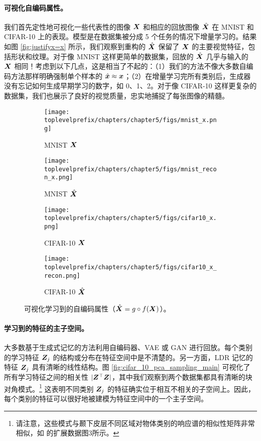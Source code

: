 \documentclass[../../book-main_zh.tex]{subfiles}
\begin{document}
\paragraph{可视化自编码属性。}
我们首先定性地可视化一些代表性的图像 $\bm{X}$ 和相应的回放图像 $\hat{\bm{X}}$ 在 MNIST 和 CIFAR-10 上的表现。模型是在数据集被分成 5 个任务的情况下增量学习的。结果如图 \ref{fig:justifyx=x} 所示，我们观察到重构的 $\hat{\bm{X}}$ 保留了 $\bm{X}$ 的主要视觉特征，包括形状和纹理。对于像 MNIST 这样更简单的数据集，回放的 $\hat{\bm{X}}$ 几乎与输入的 $\bm{X}$ 相同！考虑到以下几点，这是相当了不起的：（1）我们的方法不像大多数自编码方法那样明确强制单个样本的 $\hat{\bm{x}} \approx \bm{x}$；（2）在增量学习完所有类别后，生成器没有忘记如何生成早期学习的数字，如 0、1、2。对于像 CIFAR-10 这样更复杂的数据集，我们也展示了良好的视觉质量，忠实地捕捉了每张图像的精髓。

\begin{figure}[t]
    \begin{subfigure}[t]{0.20\textwidth}
        \centering
        \texttt{[image: \\toplevelprefix/chapters/chapter5/figs/mnist\_x.png]}
        \caption{MNIST $\bm{X}$}
    \end{subfigure}
    \hfill
    \begin{subfigure}[t]{0.20\textwidth}
        \centering
        \texttt{[image: \\toplevelprefix/chapters/chapter5/figs/mnist\_recon\_x.png]}
        \caption{MNIST $\hat{\bm{X}}$}
    \end{subfigure}
    \hfill
    \begin{subfigure}[t]{0.20\textwidth}
        \centering
        \texttt{[image: \\toplevelprefix/chapters/chapter5/figs/cifar10\_x.png]}
        \caption{CIFAR-10 $\bm{X}$}
    \end{subfigure}
    \hfill
    \begin{subfigure}[t]{0.20\textwidth}
        \centering
        \texttt{[image: \\toplevelprefix/chapters/chapter5/figs/cifar10\_x\_recon.png]}
        \caption{CIFAR-10 $\hat{\bm{X}}$}
    \end{subfigure}
    \caption{\small 可视化学习到的自编码属性（$\hat{\bm{X}} = g\circ f(\bm{X})$）。}
\end{figure}


\paragraph{学习到的特征的主子空间。}
大多数基于生成式记忆的方法利用自编码器、VAE 或 GAN 进行回放。每个类别的学习特征 $\bm{Z}_j$ 的结构或分布在特征空间中是不清楚的。另一方面，LDR 记忆的特征 $\bm{Z}_j$ 具有清晰的线性结构。图 \ref{fig:cifar_10_pca_sampling_main} 可视化了所有学习特征之间的相关性 $|\bm{Z}^\top\bm{Z}|$，其中我们观察到两个数据集都具有清晰的块对角模式。\footnote{请注意，这些模式与颞下皮层不同区域对物体类别的响应谱的相似性矩阵非常相似，如 \cite{Bao2020AMO} 的扩展数据图3所示。} 这表明不同类别 $\bm{Z}_j$ 的特征确实位于相互不相关的子空间上。因此，每个类别的特征可以很好地被建模为特征空间中的一个主子空间。%
\end{document}
